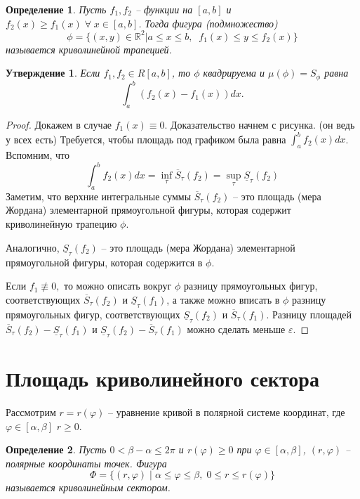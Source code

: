 \documentclass{article}
\theoremstyle{plain}
\newtheorem{claim}{Утверждение}
\newtheorem{definition}{Определение}
\theoremstyle{definition}
\theoremstyle{remark}
\renewcommand{\*}{\cdot}
\begin{document}
\begin{definition}
Пусть $f_1, f_2$ -- функции на $[a,b]$ и $f_2(x) \geq f_1(x) \;\forall\; x\in [a, b]$. Тогда фигура (подмножество)
$$\phi = \{(x, y) \in \mathbb{R}^2 | a\leq x\leq b, \;\; f_1(x)\leq y \leq f_2(x) \}$$ называется криволинейной трапецией.
\end{definition}

\begin{claim}
Если $f_1, f_2 \in R[a, b]$, то $\phi$ квадрируема и $\mu(\phi) = S_{\phi}$ равна 
$$\int_a^b (f_2(x) - f_1(x))dx.$$


\end{claim}

\begin{proof}
Докажем в случае $f_1(x) \equiv 0.$ Доказательство начнем с рисунка. (он ведь у всех есть) Требуется, чтобы площадь под графиком была равна $\int_a^b f_2(x)dx$. Вспомним, что 
$$\int_a^b f_2(x)dx = \inf_{\tau}\overline{S}_{\tau}(f_2) = \sup_{\tau}\underline{S}_{\tau}(f_2)$$
Заметим, что верхние интегральные суммы $\overline{S}_{\tau}(f_2)$ -- это площадь (мера Жордана) элементарной прямоугольной фигуры, которая содержит криволинейную трапецию $\phi$.

Аналогично, $\underline{S}_{\tau}(f_2)$ -- это площадь (мера Жордана) элементарной прямоугольной фигуры, которая содержится в $\phi$. 

Если $f_1 \not\equiv 0,$ то можно описать вокруг $\phi$ разницу прямоугольных фигур, соответствующих $\overline{S}_{\tau}(f_2)$ и $\underline{S}_{\tau}(f_1)$, а также можно вписать в $\phi$ разницу прямоугольных фигур, соответствующих $\underline{S}_{\tau}(f_2)$ и $\overline{S}_{\tau}(f_1)$.
Разницу площадей
$\overline{S}_{\tau}(f_2) - \underline{S}_{\tau}(f_1)$ и  $\underline{S}_{\tau}(f_2) - \overline{S}_{\tau}(f_1)$ можно сделать меньше $\varepsilon$. %

\end{proof}

\section{Площадь криволинейного сектора}

Рассмотрим $r = r(\varphi)$ -- уравнение кривой в полярной системе координат, где $\varphi\in[\alpha, \beta]$ $r \geq 0$.

\begin{definition}
Пусть $0<\beta - \alpha \leq 2\pi$ и $r(\varphi)\geq 0$ при $\varphi\in[\alpha, \beta]$, $(r, \varphi)$ -- полярные координаты точек. Фигура 
\[
\Phi = \{(r, \varphi) \;|\; \alpha \leq \varphi \leq \beta,\;0\leq r\leq r(\varphi)\}
\]
называется криволинейным сектором.
\end{definition}
\end{document}
